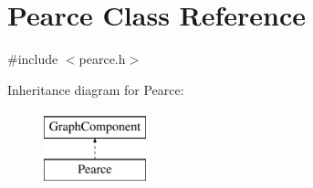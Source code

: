\hypertarget{class_pearce}{}\section{Pearce Class Reference}
\label{class_pearce}


{\ttfamily \#include $<$pearce.\+h$>$}

Inheritance diagram for Pearce\+:\begin{figure}[H]
\begin{center}
\leavevmode
\includegraphics[height=2.000000cm]{class_pearce}
\end{center}
\end{figure}
